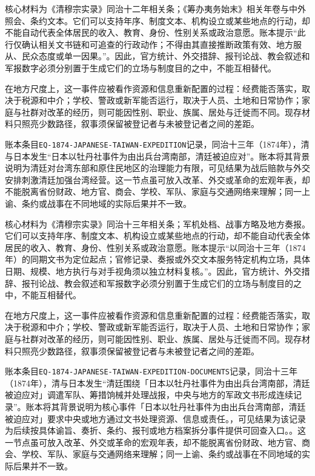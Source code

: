 核心材料为《清穆宗实录》同治十二年相关条；《筹办夷务始末》相关年卷与中外照会、条约文本。它们可以支持年序、制度文本、机构设立或某些地点的行动，却不能自动代表全体居民的收入、教育、身份、性别关系或政治意愿。账本提示“此行仅确认相关文书链和可追查的行政动作；不得由其直接推断政策有效、地方服从、民众态度或单一因果。”。因此，官方统计、外交措辞、报刊论战、教会叙述和军报数字必须分别置于生成它们的立场与制度目的之中，不能互相替代。

在地方尺度上，这一事件应被看作资源和信息重新配置的过程：经费能否落实，取决于税源和中介；学校、警政或新军能否运行，取决于人员、土地和日常协作；家庭与社群对改革的经历，则可能因性别、职业、族属、居处与迁徙而不同。现存材料只照亮少数路径，叙事须保留被登记者与未被登记者之间的差距。

账本条目\texttt{EQ-1874-JAPANESE-TAIWAN-EXPEDITION}记录，同治十三年（1874年），清与日本发生“日本以牡丹社事件为由出兵台湾南部，清廷被迫应对”。账本将其背景说明为清廷对台湾东部和原住民地区的治理能力有限，可见结果为战后赔款与外交安排刺激清廷加强台湾经营。这一节点虽可放入改革、外交或革命的宏观年表，却不能脱离省份财政、地方官、商会、学校、军队、家庭与交通网络来理解；同一上谕、条约或战事在不同地域的实际后果并不一致。

核心材料为《清穆宗实录》同治十三年相关条；军机处档、战事方略及地方奏报。它们可以支持年序、制度文本、机构设立或某些地点的行动，却不能自动代表全体居民的收入、教育、身份、性别关系或政治意愿。账本提示“以同治十三年（1874年）的同期文书为定位起点；官修记录、奏报或外交文本服务特定机构立场，具体日期、规模、地方执行与对手视角须以独立材料复核。”。因此，官方统计、外交措辞、报刊论战、教会叙述和军报数字必须分别置于生成它们的立场与制度目的之中，不能互相替代。

在地方尺度上，这一事件应被看作资源和信息重新配置的过程：经费能否落实，取决于税源和中介；学校、警政或新军能否运行，取决于人员、土地和日常协作；家庭与社群对改革的经历，则可能因性别、职业、族属、居处与迁徙而不同。现存材料只照亮少数路径，叙事须保留被登记者与未被登记者之间的差距。

账本条目\texttt{EQ-1874-JAPANESE-TAIWAN-EXPEDITION-DOCUMENTS}记录，同治十三年（1874年），清与日本发生“清廷围绕「日本以牡丹社事件为由出兵台湾南部，清廷被迫应对」调遣军队、筹措饷械并处理战报，中央与地方的军政文书形成连续记录”。账本将其背景说明为核心事件「日本以牡丹社事件为由出兵台湾南部，清廷被迫应对」要求中央或地方通过文书处理资源、信息或责任。，可见结果为该记录为后续按具体谕旨、奏折、条约、报刊或地方档案拆分事件提供可回查入口。。这一节点虽可放入改革、外交或革命的宏观年表，却不能脱离省份财政、地方官、商会、学校、军队、家庭与交通网络来理解；同一上谕、条约或战事在不同地域的实际后果并不一致。

